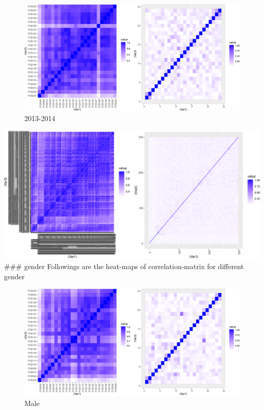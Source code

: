 \documentclass[]{article}
\begin{document}
\begin{figure}
\centering
\includegraphics{PCBs_covariance_files/figure-latex/unnamed-chunk-27-1.pdf}
\caption{2013-2014}
\end{figure}

\includegraphics{PCBs_covariance_files/figure-latex/unnamed-chunk-28-1.pdf}
\#\#\# gender Followings are the heat-maps of correlation-matrix for
different gender

\begin{figure}
\centering
\includegraphics{PCBs_covariance_files/figure-latex/unnamed-chunk-29-1.pdf}
\caption{Male}
\end{figure}
\end{document}
